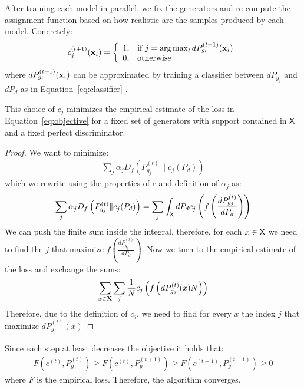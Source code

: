 \documentclass{article}
\newcommand{\Pd}{P_{d}}
\DeclareMathOperator*{\argmax}{arg\,max}
\begin{document}
After training each model in parallel, we fix the generators and re-compute the assignment function based on how realistic are the samples produced by each model. Concretely:
 \[
   c_j^{(t+1)}(\bx_i) = \left\{\begin{array}{ll}
        1, & \text{if } j = \argmax_l dP_{g_l}^{(t+1)}(\bx_i) \\
        0, & \text{otherwise }
        \end{array}\right. 
  \]
  where $dP_{g_l}^{(t+1)}({\mathbf{x}}_i)$ can be approximated by training a classifier between $dP_{g_j}$ and $d\Pd$ as in Equation~\eqref{eq:classifier} . 
  \begin{theorem}
  This choice of $c_j$ minimizes the empirical estimate of the loss in Equation~\eqref{eq:objective} for a fixed set of generators with support contained in $\mathsf{X}$ and a fixed perfect discriminator. 
  \begin{proof}
  We want to minimize:
  \begin{align*}
 \sum_j \alpha_j D_f\left(P_{g_j}^{(t)}\|c_j(\Pd)\right)
  \end{align*}
  which we rewrite using the properties of $c$ and definition of $\alpha_j$ as: 
  \begin{align}
   \sum_j \alpha_j D_f\left(P_{g_j}^{(t)}\|c_j(\Pd)\right) =  \sum_j  \int_{\sfX} d\Pd c_j \left(f\left(\frac{dP_{g_j}^{(t)}}{d\Pd}\right)\right)
  \end{align}
We can push the finite sum inside the integral, therefore, for each $x\in\mathsf{X}$ we need to find the $j$ that maximize $f\left(\frac{dP_{g_j}^{(t)}}{d\Pd}\right)$. 
 Now we turn to the empirical estimate of the loss and exchange the sums: 
 \begin{align*}
 \sum_{x\in{\mathbf{X}}}  \sum_j \frac{1}{N} c_j \left(f\left({dP_{g_j}^{(t)}(x)N}\right)\right)
 \end{align*}
 Therefore, due to the definition of $c_j$, we need to find for every $x$ the index $j$ that maximize $dP_{g_j}^{(t)}(x)$
  \end{proof}
  \end{theorem}  
\begin{corollary}\label{cor:decrease}
Since each step at least decreases the objective it holds that:
\begin{align*}
F(c^{(t)},P^{(t)}_{g}) \geq F(c^{(t)},P_{g}^{(t+1)}) \geq F(c^{(t+1)},P_{g}^{(t+1)}) \geq 0 
\end{align*}
where $F$ is the empirical loss.
Therefore, the algorithm converges.
\end{corollary}  
\end{document}
